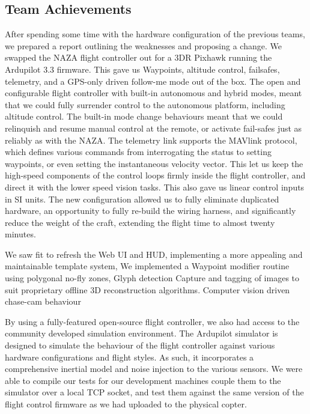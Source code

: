 \documentclass[a4paper, 11pt, titlepage]{article}
\begin{document}
  \subsection{Team Achievements}
    After spending some time with the hardware configuration of the previous teams, we prepared a report outlining the weaknesses and proposing a change.
    We swapped the NAZA flight controller out for a 3DR Pixhawk running the Ardupilot 3.3 firmware.  This gave us Waypoints, altitude control, failsafes, telemetry, and a GPS-only driven follow-me mode out of the box.
    The open and configurable flight controller with built-in autonomous and hybrid modes, meant that we could fully surrender control to the autonomous platform, including altitude control.  The built-in mode change behaviours meant that we could relinquish and resume manual control at the remote, or activate fail-safes just as reliably as with the NAZA.
    The telemetry link supports the MAVlink protocol, which defines various commands from interrogating the status to setting waypoints, or even setting the instantaneous velocity vector.  This let us keep the high-speed components of the control loops firmly inside the flight controller, and direct it with the lower speed vision tasks.  This also gave us linear control inputs in SI units.
    The new configuration allowed us to fully eliminate duplicated hardware, an opportunity to fully re-build the wiring harness, and significantly reduce the weight of the craft, extending the flight time to almost twenty minutes.
    
    We saw fit to refresh the Web UI and HUD, implementing a more appealing and maintainable template system,
    We implemented a Waypoint modifier routine using polygonal no-fly zones,
    Glyph detection
    Capture and tagging of images to suit proprietary offline 3D reconstruction algorithms.
    Computer vision driven chase-cam behaviour

    By using a fully-featured open-source flight controller, we also had access to the community developed simulation environment.  The Ardupilot simulator is designed to simulate the behaviour of the flight controller against various hardware configurations and flight styles.  As such, it incorporates a comprehensive inertial model and noise injection to the various sensors.  We were able to compile our tests for our development machines couple them to the simulator over a local TCP socket, and test them against the same version of the flight control firmware as we had uploaded to the physical copter.
\end{document}
